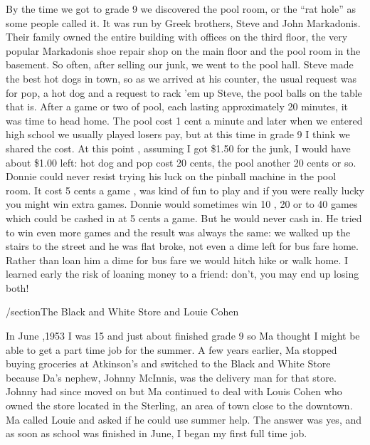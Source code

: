 By the time we got to grade 9 we discovered the pool room, or the “rat hole” as some people called it. It was run by Greek brothers, Steve and John Markadonis. Their family owned the entire building with offices on the third floor, the very popular Markadonis shoe repair shop on the main floor and the pool room in the basement. So often, after selling our junk, we went to the pool hall. Steve made the best hot dogs in town, so as we arrived at his counter, the usual request was for pop, a hot dog and a request to rack 'em up Steve, the pool balls on the table that is. After a game or two of pool, each lasting approximately 20 minutes, it was time to head home. The pool cost 1 cent a minute and later when we entered high school we usually played losers pay, but at this time in grade 9 I think we shared the cost. At this point , assuming I got \$1.50 for the junk, I would have about \$1.00 left: hot dog and pop cost 20 cents, the pool another 20 cents or so. Donnie could never resist trying his luck on the pinball machine in the pool room. It cost 5 cents a game , was kind of fun to play and if you were really lucky you might win extra games. Donnie would sometimes win 10 , 20 or to 40 games which could be cashed in at 5 cents a game. But he would never cash in. He tried to win even more games and the result was always the same: we walked up the stairs to the street and he was flat broke, not even a dime left for bus fare home. Rather than loan him a dime for bus fare we would hitch hike or walk home. I learned early the risk of loaning money to a friend: don't, you may end up losing both!

/section{The Black and White Store and Louie Cohen}

In June ,1953 I was 15 and just about finished grade 9 so Ma thought I might be able to get a part time job for the summer. A few years earlier, Ma stopped buying groceries at Atkinson's and switched to the Black and White Store because Da's nephew, Johnny McInnis, was the delivery man for that store. Johnny had since moved on but Ma continued to deal with Louis Cohen who owned the store located in the Sterling, an area of town close to the downtown. Ma called Louie and asked if he could use summer help. The answer was yes, and as soon as school was finished in June, I began my first full time job.

